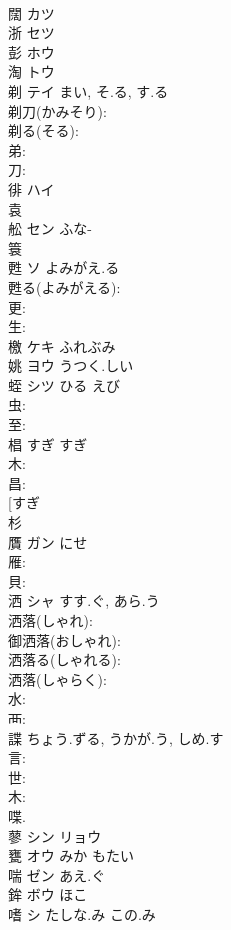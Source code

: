 \documentclass[8pt]{extreport}
\begin{document}
\begin{CJK}{UTF8}{min}
\\	闊	カツ			
\\	浙	セツ			
\\	彭	ホウ			
\\	淘	トウ			
\\	剃	テイ	まい, そ.る, す.る		
\\	剃刀(かみそり): 
\\	剃る(そる): 
\\	弟: 
\\	刀: 
\\	徘	ハイ			
\\	袁						
\\	舩	セン ふな-					
\\	簑						
\\	甦	ソ	よみがえ.る		
\\	甦る(よみがえる): 
\\	更: 
\\	生: 
\\	檄	ケキ ふれぶみ			
\\	姚	ヨウ うつく.しい			
\\	蛭	シツ	ひる	えび	
\\	虫: 
\\	至: 
\\	椙	すぎ	すぎ		
\\	木: 
\\	昌: 
\\	[すぎ 
\\	杉 
\\	贋	ガン	にせ		
\\	雁: 
\\	貝: 
\\	洒	シャ	すす.ぐ, あら.う		
\\	洒落(しゃれ): 
\\	御洒落(おしゃれ): 
\\	洒落る(しゃれる): 
\\	洒落(しゃらく): 
\\	水: 
\\	襾: 
\\	諜		ちょう.ずる, うかが.う, しめ.す				
\\	言: 
\\	世: 
\\	木: 
\\	喋. 
\\	蓼	シン リョウ			
\\	甕	オウ みか もたい			
\\	喘	ゼン あえ.ぐ			
\\	鉾	ボウ ほこ			
\\	嗜	シ たしな.み この.み			

\end{CJK}
\end{document}
